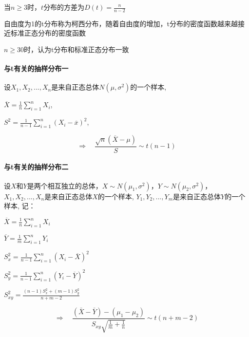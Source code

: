 \documentclass[UTF8,10pt]{book}
\begin{document}
            {\kaishu 当$n \ge 3$时，$t$分布的方差为$D(t) = \frac{n}{n-2}$ }

            {\kaishu 自由度为1的t分布称为柯西分布，随着自由度的增加，t分布的密度函数越来越接近标准正态分布的密度函数}

            {\kaishu $n \ge 30$时，认为t分布和标准正态分布一致}

            \paragraph{与t有关的抽样分布一}

            设$X_1,X_2,...,X_n$是来自正态总体$N(\mu,\sigma^2)$的一个样本,

            $ \overline{X} = \frac{1}{n} \sum_{i=1}^n X_i $,

            $ S^2 = \frac{1}{n-1}  \sum_{i=1}^n (X_i -\overline{x})^2 $,

            $$ \Rightarrow \quad \frac{\sqrt{n}(\overline{X}-\mu)}{S}  \sim t(n-1)$$

            \paragraph{与t有关的抽样分布二}
            
            设$X$和$Y$是两个相互独立的总体，$X \sim N(\mu_1,\sigma^2)$，$Y \sim N(\mu_2,\sigma^2)$，
            $X_1,X_2,...,X_n$是来自正态总体$X$的一个样本,
            $Y_1,Y_2,...,Y_m$是来自正态总体$Y$的一个样本,
            记：

            $ \overline{X} = \frac{1}{n} \sum_{i=1}^n X_i $

            $ \overline{Y} = \frac{1}{m} \sum_{i=1}^n Y_i $

            $ S_x^2 = \frac{1}{n-1}  \sum_{i=1}^n (X_i -\overline{X})^2 $

            $ S_y^2 = \frac{1}{n-1}  \sum_{i=1}^n (Y_i -\overline{Y})^2 $

            $ S_{xy}^2 = \frac{  (n-1)S_x^2 + (m-1)S_y^2  }   {  n+m-2  } $

            $$ \Rightarrow \quad \frac{(\bar{X}-\bar{Y})-\left(\mu_{1}-\mu_{2}\right)}{S_{x y} \sqrt{\frac{1}{m}+\frac{1}{n}}}  \sim t(n+m-2) $$
\end{document}
